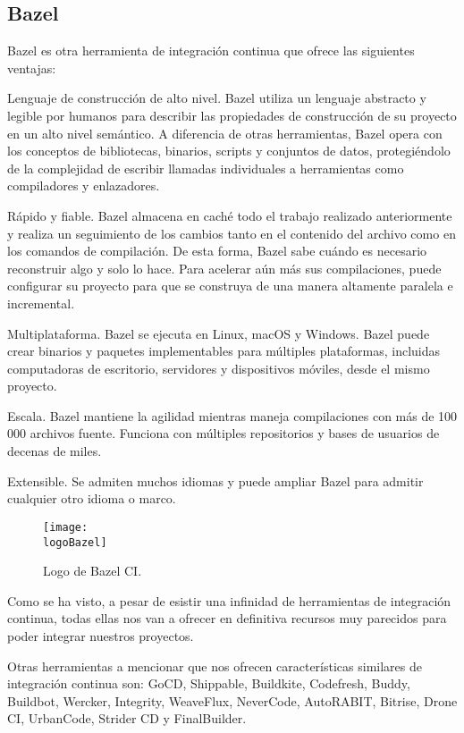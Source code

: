 \subsection{Bazel}
Bazel es otra herramienta de integración continua que ofrece las siguientes ventajas:
\begin{compactitem}
    \item Lenguaje de construcción de alto nivel. Bazel utiliza un lenguaje abstracto y legible por humanos para describir las propiedades de construcción de su proyecto en un alto nivel semántico. A diferencia de otras herramientas, Bazel opera con los conceptos de bibliotecas, binarios, scripts y conjuntos de datos, protegiéndolo de la complejidad de escribir llamadas individuales a herramientas como compiladores y enlazadores.
    \item Rápido y fiable. Bazel almacena en caché todo el trabajo realizado anteriormente y realiza un seguimiento de los cambios tanto en el contenido del archivo como en los comandos de compilación. De esta forma, Bazel sabe cuándo es necesario reconstruir algo y solo lo hace. Para acelerar aún más sus compilaciones, puede configurar su proyecto para que se construya de una manera altamente paralela e incremental.
    \item Multiplataforma. Bazel se ejecuta en Linux, macOS y Windows. Bazel puede crear binarios y paquetes implementables para múltiples plataformas, incluidas computadoras de escritorio, servidores y dispositivos móviles, desde el mismo proyecto.
    \item Escala. Bazel mantiene la agilidad mientras maneja compilaciones con más de 100 000 archivos fuente. Funciona con múltiples repositorios y bases de usuarios de decenas de miles.
    \item Extensible. Se admiten muchos idiomas y puede ampliar Bazel para admitir cualquier otro idioma o marco.
\end{compactitem}

\begin{figure}[h]
    \centering
    \texttt{[image: \\logoBazel]}
    \caption{Logo de Bazel CI.}
\end{figure}

Como se ha visto, a pesar de esistir una infinidad de herramientas de integración continua, todas ellas nos van a ofrecer en definitiva recursos muy parecidos para poder integrar nuestros proyectos.

Otras herramientas a mencionar que nos ofrecen características similares de integración continua son: GoCD, Shippable, Buildkite, Codefresh, Buddy, Buildbot, Wercker, Integrity, WeaveFlux, NeverCode, AutoRABIT, Bitrise, Drone CI, UrbanCode, Strider CD y FinalBuilder.

